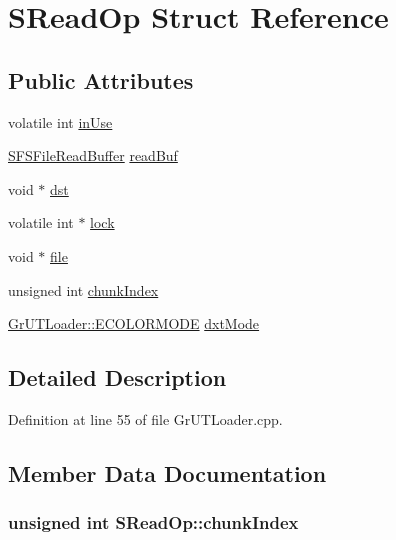\hypertarget{struct_s_read_op}{
\section{SReadOp Struct Reference}
\label{struct_s_read_op}
}
\subsection*{Public Attributes}
\begin{CompactItemize}
\item 
volatile int \hyperlink{struct_s_read_op_0b63dfe493c6fd53dabbae584ac8ebad}{inUse}
\item 
\hyperlink{struct_s_f_s_file_read_buffer__t}{SFSFileReadBuffer} \hyperlink{struct_s_read_op_5dfa4e1259cc150ba724f3dfe5347625}{readBuf}
\item 
void $\ast$ \hyperlink{struct_s_read_op_2ab52c14ca79eb32510a57b17687277a}{dst}
\item 
volatile int $\ast$ \hyperlink{struct_s_read_op_4cd669ce61cf52bd17aa2e2ffd0ba3d7}{lock}
\item 
void $\ast$ \hyperlink{struct_s_read_op_97f473e8a311f9c61ed81c3360db8f5e}{file}
\item 
unsigned int \hyperlink{struct_s_read_op_6a379dc44d78f10a7c9fb91b195445c6}{chunkIndex}
\item 
\hyperlink{class_gr_u_t_loader_328b8875d7cc411c1ad47f0d9279d8f2}{GrUTLoader::ECOLORMODE} \hyperlink{struct_s_read_op_8142466165097715bb137171deb0c7ab}{dxtMode}
\end{CompactItemize}


\subsection{Detailed Description}


Definition at line 55 of file GrUTLoader.cpp.

\subsection{Member Data Documentation}
\hypertarget{struct_s_read_op_6a379dc44d78f10a7c9fb91b195445c6}{
\subsubsection[{chunkIndex}]{\setlength{\rightskip}{0pt plus 5cm}unsigned int {\bf SReadOp::chunkIndex}}}
\label{struct_s_read_op_6a379dc44d78f10a7c9fb91b195445c6}




